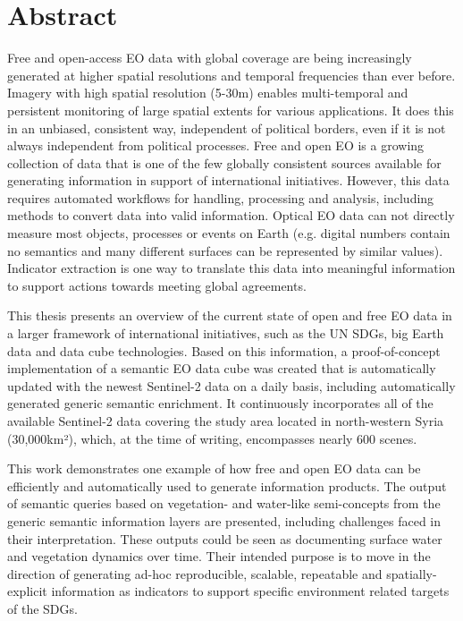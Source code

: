 \cleardoublepage
{}
\begingroup
\let\cleardoublepage\relax
\let\cleardoublepage\relax

\chapter*{Abstract}

Free and open-access \acf{EO} data with global coverage are being increasingly generated at higher spatial resolutions and temporal frequencies than ever before. Imagery with high spatial resolution (5-30\acs{m}) enables multi-temporal and persistent monitoring of large spatial extents for various applications. It does this in an unbiased, consistent way, independent of political borders, even if it is not always independent from political processes. Free and open \acs{EO} is a growing collection of data that is one of the few globally consistent sources available for generating information in support of international initiatives. However, this data requires automated workflows for handling, processing and analysis, including methods to convert data into valid information. Optical \acs{EO} data can not directly measure most objects, processes or events on Earth (e.g. digital numbers contain no semantics and many different surfaces can be represented by similar values). Indicator extraction is one way to translate this data into meaningful information to support actions towards meeting global agreements.

This thesis presents an overview of the current state of open and free \acs{EO} data in a larger framework of international initiatives, such as the \acs{UN} \acp{SDG}, big Earth data and data cube technologies. Based on this information, a proof-of-concept implementation of a semantic \acs{EO} data cube was created that is automatically updated with the newest Sentinel-2 data on a daily basis, including automatically generated generic semantic enrichment. It continuously incorporates all of the available Sentinel-2 data covering the study area located in north-western Syria (30,000\acs{km}²), which, at the time of writing, encompasses nearly 600 scenes.

This work demonstrates one example of how free and open \acs{EO} data can be efficiently and automatically used to generate information products. The output of semantic queries based on vegetation- and water-like semi-concepts from the generic semantic information layers are presented, including challenges faced in their interpretation. These outputs could be seen as documenting surface water and vegetation dynamics over time. Their intended purpose is to move in the direction of generating ad-hoc reproducible, scalable, repeatable and spatially-explicit information as indicators to support specific environment related targets of the \acp{SDG}.


